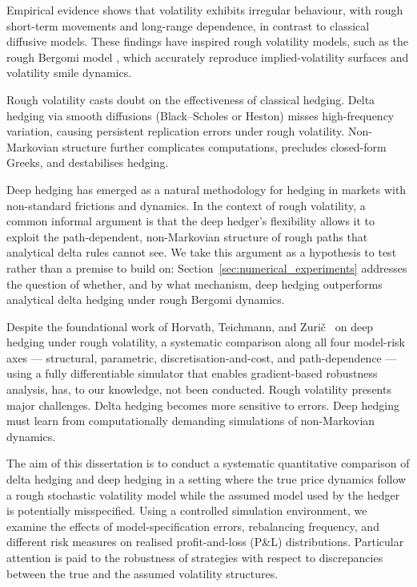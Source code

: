 \documentclass[12pt,a4paper]{article}
\theoremstyle{definition}
\theoremstyle{plain}
\theoremstyle{remark}
\theoremstyle{plain}
\begin{document}
Empirical evidence shows that volatility exhibits irregular behaviour, with rough short-term movements and long-range dependence, in contrast to classical diffusive models. These findings \cite{GatheralRough} have inspired rough volatility models, such as the rough Bergomi model \cite{BayerFriz2016}, which accurately reproduce implied-volatility surfaces and volatility smile dynamics.

Rough volatility casts doubt on the effectiveness of classical hedging. Delta hedging via smooth diffusions (Black–Scholes or Heston) misses high-frequency variation, causing persistent replication errors under rough volatility. Non-Markovian structure further complicates computations, precludes closed-form Greeks, and destabilises hedging.

Deep hedging has emerged as a natural methodology for hedging in markets with non-standard frictions and dynamics. In the context of rough volatility, a common informal argument is that the deep hedger's flexibility allows it to exploit the path-dependent, non-Markovian structure of rough paths that analytical delta rules cannot see. We take this argument as a hypothesis to test rather than a premise to build on: Section~\ref{sec:numerical_experiments} addresses the question of whether, and by what mechanism, deep hedging outperforms analytical delta hedging under rough Bergomi dynamics.

Despite the foundational work of Horvath, Teichmann, and Zuri\v{c}~\cite{Horvath2021DeepRough} on deep hedging under rough volatility, a systematic comparison along all four model-risk axes --- structural, parametric, discretisation-and-cost, and path-dependence --- using a fully differentiable simulator that enables gradient-based robustness analysis, has, to our knowledge, not been conducted. Rough volatility presents major challenges. Delta hedging becomes more sensitive to errors. Deep hedging must learn from computationally demanding simulations of non-Markovian dynamics.

The aim of this dissertation is to conduct a systematic quantitative comparison of delta hedging and deep hedging in a setting where the true price dynamics follow a rough stochastic volatility model while the assumed model used by the hedger is potentially misspecified. Using a controlled simulation environment, we examine the effects of model-specification errors, rebalancing frequency, and different risk measures on realised profit-and-loss (P\&L) distributions. Particular attention is paid to the robustness of strategies with respect to discrepancies between the true and the assumed volatility structures.
\end{document}
